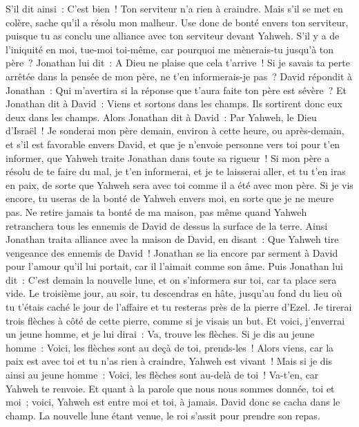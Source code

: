 \begin{multicols}{2}
S'il dit ainsi~: C'est bien~! Ton serviteur n'a rien à craindre. Mais s'il se met en colère, sache qu'il a résolu mon malheur.
Use donc de bonté envers ton serviteur, puisque tu as conclu une alliance avec ton serviteur devant Yahweh. S'il y a de l'iniquité en moi, tue-moi toi-même, car pourquoi me mènerais-tu jusqu'à ton père~?
Jonathan lui dit~: A Dieu ne plaise que cela t'arrive~! Si je savais ta perte arrêtée dans la pensée de mon père, ne t'en informerais-je pas~?
David répondit à Jonathan~: Qui m'avertira si la réponse que t'aura faite ton père est sévère~?
Et Jonathan dit à David~: Viens et sortons dans les champs. Ils sortirent donc eux deux dans les champs.
Alors Jonathan dit à David~: Par Yahweh, le Dieu d'Israël~! Je sonderai mon père demain, environ à cette heure, ou après-demain, et s'il est favorable envers David, et que je n'envoie personne vers toi pour t'en informer,
que Yahweh traite Jonathan dans toute sa rigueur~! Si mon père a résolu de te faire du mal, je t'en informerai, et je te laisserai aller, et tu t'en iras en paix, de sorte que Yahweh sera avec toi comme il a été avec mon père.
Si je vis encore, tu useras de la bonté de Yahweh envers moi, en sorte que je ne meure pas.
Ne retire jamais ta bonté de ma maison, pas même quand Yahweh retranchera tous les ennemis de David de dessus la surface de la terre.
Ainsi Jonathan traita alliance avec la maison de David, en disant~: Que Yahweh tire vengeance des ennemis de David~!
Jonathan se lia encore par serment à David pour l'amour qu'il lui portait, car il l'aimait comme son âme.
Puis Jonathan lui dit~: C'est demain la nouvelle lune, et on s'informera sur toi, car ta place sera vide.
Le troisième jour, au soir, tu descendras en hâte, jusqu'au fond du lieu où tu t'étais caché le jour de l'affaire et tu resteras près de la pierre d'Ezel.
Je tirerai trois flèches à côté de cette pierre, comme si je visais un but.
Et voici, j'enverrai un jeune homme, et je lui dirai~: Va, trouve les flèches. Si je dis au jeune homme~: Voici, les flèches sont au deçà de toi, prends-les~! Alors viens, car la paix est avec toi et tu n'as rien à craindre, Yahweh est vivant~!
Mais si je dis ainsi au jeune homme~: Voici, les flèches sont au-delà de toi~! Va-t'en, car Yahweh te renvoie.
Et quant à la parole que nous nous sommes donnée, toi et moi~; voici, Yahweh est entre moi et toi, à jamais.
David donc se cacha dans le champ. La nouvelle lune étant venue, le roi s'assit pour prendre son repas.

\end{multicols}
